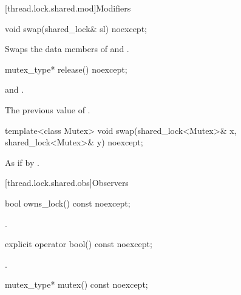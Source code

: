 [thread.lock.shared.mod]{Modifiers}

%
\begin{itemdecl}
void swap(shared_lock& sl) noexcept;
\end{itemdecl}

\begin{itemdescr}
\pnum
\effects
Swaps the data members of  and .
\end{itemdescr}

%
\begin{itemdecl}
mutex_type* release() noexcept;
\end{itemdecl}

\begin{itemdescr}
\pnum
\ensures
{} and .

\pnum
\returns
The previous value of .
\end{itemdescr}

%
\begin{itemdecl}
template<class Mutex>
  void swap(shared_lock<Mutex>& x, shared_lock<Mutex>& y) noexcept;
\end{itemdecl}

\begin{itemdescr}
\pnum
\effects
As if by .
\end{itemdescr}

[thread.lock.shared.obs]{Observers}

%
\begin{itemdecl}
bool owns_lock() const noexcept;
\end{itemdecl}

\begin{itemdescr}
\pnum
\returns
{}.
\end{itemdescr}

%
\begin{itemdecl}
explicit operator bool() const noexcept;
\end{itemdecl}

\begin{itemdescr}
\pnum
\returns
{}.
\end{itemdescr}

%
\begin{itemdecl}
mutex_type* mutex() const noexcept;
\end{itemdecl}

